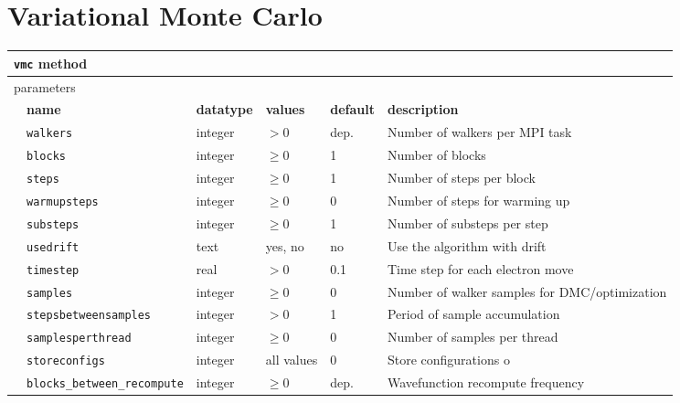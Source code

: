 \section{Variational Monte Carlo}
\label{sec:vmc}

\begin{table}[h]
\begin{tabularx}{\textwidth}{l l l l l X }
\hline
\multicolumn{6}{l}{\texttt{vmc} method} \\
\hline
\multicolumn{2}{l}{parameters}  & \multicolumn{4}{l}{}\\
   &   \bfseries name     & \bfseries datatype & \bfseries values & \bfseries default   & \bfseries description \\
   &   \texttt{walkers             } &  integer  & $> 0$   & dep.& Number of walkers per MPI task  \\
   &   \texttt{blocks              } &  integer  & $\ge 0$ & 1   & Number of blocks            \\
   &   \texttt{steps               } &  integer  & $\ge 0$ & 1   & Number of steps per block   \\
   &   \texttt{warmupsteps         } &  integer  & $\ge 0$ & 0   & Number of steps for warming up\\
   &   \texttt{substeps            } &  integer  & $\ge 0$ & 1   & Number of substeps per step \\
   &   \texttt{usedrift            } &  text     & yes, no & no  & Use the algorithm with drift\\
   &   \texttt{timestep            } &  real     & $> 0$   & 0.1 & Time step for each electron move \\
   &   \texttt{samples             } &  integer  & $\ge 0$ & 0   & Number of walker samples for DMC/optimization\\
   &   \texttt{stepsbetweensamples } &  integer  & $> 0$   & 1   & Period of sample accumulation\\
   &   \texttt{samplesperthread    } &  integer  & $\ge 0$ & 0   & Number of samples per thread  \\
   &   \texttt{storeconfigs        } &  integer  & all values & 0   & Store configurations o  \\
   &   \texttt{blocks\_between\_recompute} &  integer  & $\ge 0$ & dep.  & Wavefunction recompute frequency  \\
  \hline
\end{tabularx}
\end{table}

